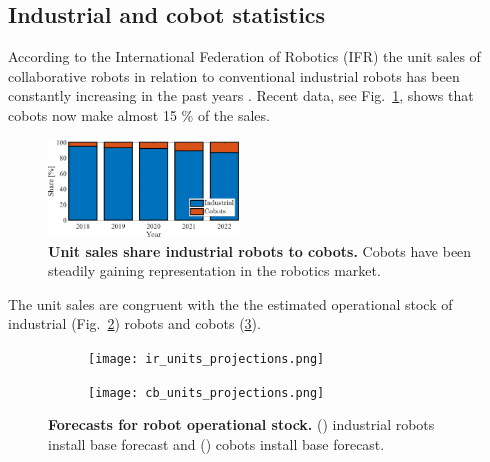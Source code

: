 \subsection{Industrial and cobot statistics}\label{sec:robot_statistics}
According to the International Federation of Robotics (IFR) the unit sales of collaborative robots in relation to conventional industrial robots has been constantly increasing in the past years \cite{statista_ir_cobot_share}. Recent data, see Fig.~\ref{fig:industrial_cobot_share}, shows that cobots now make almost 15 \% of the sales.
\begin{figure}[!h]
	\centering
	\includegraphics[width= 0.45\textwidth]{fig/share_industrial_and_cobots.png} 
	\caption{\textbf{Unit sales share industrial robots to cobots.} Cobots have been steadily gaining representation in the robotics market.}
	\label{fig:industrial_cobot_share}
\end{figure}

The unit sales are congruent with the the estimated operational stock of industrial (Fig.~\ref{fig:ir_stock}) robots and cobots (\ref{fig:cobot_stock}).
\begin{figure}[t!]
	\centering
	\hspace*{\fill}
	\begin{subfigure}[b]{0.45\textwidth}
		\subcaption{}
		\texttt{[image: ir\_units\_projections.png]}
		\label{fig:ir_stock}
	\end{subfigure}
	\hfill
	\begin{subfigure}[b]{0.45\textwidth}
		\subcaption{}
		\texttt{[image: cb\_units\_projections.png]}
		\label{fig:cobot_stock}
	\end{subfigure}
	\hspace*{\fill}	
	\caption[] {\label{fig:robot_forecasts} \textbf{Forecasts for robot operational stock.} () industrial robots install base forecast and () cobots install base forecast.}	
\end{figure}
\newpage

